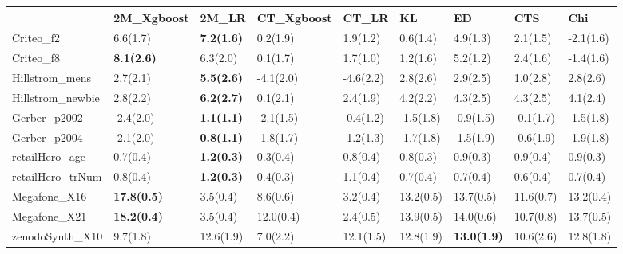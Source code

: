 
\begin{tabular}{|l|llllllll|}
\hline
{} &          2M\_Xgboost &                2M\_LR & CT\_Xgboost & CT\_LR &                  KL &                   ED &        CTS &                 Chi \\
\hline
Criteo\_f2        &             6.6(1.7) &  \bfseries 7.2(1.6) &    0.2(1.9) &            1.9(1.2) &            0.6(1.4) &             4.9(1.3) &   2.1(1.5) &           -2.1(1.6) \\
Criteo\_f8        &   \bfseries 8.1(2.6) &            6.3(2.0) &    0.1(1.7) &            1.7(1.0) &            1.2(1.6) &             5.2(1.2) &   2.4(1.6) &           -1.4(1.6) \\
Hillstrom\_mens   &             2.7(2.1) &  \bfseries 5.5(2.6) &   -4.1(2.0) &           -4.6(2.2) &            2.8(2.6) &             2.9(2.5) &   1.0(2.8) &            2.8(2.6) \\
Hillstrom\_newbie &             2.8(2.2) &  \bfseries 6.2(2.7) &    0.1(2.1) &            2.4(1.9) &            4.2(2.2) &             4.3(2.5) &   4.3(2.5) &            4.1(2.4) \\
Gerber\_p2002     &            -2.4(2.0) &  \bfseries 1.1(1.1) &   -2.1(1.5) &           -0.4(1.2) &           -1.5(1.8) &            -0.9(1.5) &  -0.1(1.7) &           -1.5(1.8) \\
Gerber\_p2004     &            -2.1(2.0) &  \bfseries 0.8(1.1) &   -1.8(1.7) &           -1.2(1.3) &           -1.7(1.8) &            -1.5(1.9) &  -0.6(1.9) &           -1.9(1.8) \\
retailHero\_age   &             0.7(0.4) &  \bfseries 1.2(0.3) &    0.3(0.4) &            0.8(0.4) &            0.8(0.3) &             0.9(0.3) &   0.9(0.4) &            0.9(0.3) \\
retailHero\_trNum &             0.8(0.4) &  \bfseries 1.2(0.3) &    0.4(0.3) &            1.1(0.4) &            0.7(0.4) &             0.7(0.4) &   0.6(0.4) &            0.7(0.4) \\
Megafone\_X16     &  \bfseries 17.8(0.5) &            3.5(0.4) &    8.6(0.6) &            3.2(0.4) &           13.2(0.5) &            13.7(0.5) &  11.6(0.7) &           13.2(0.4) \\
Megafone\_X21     &  \bfseries 18.2(0.4) &            3.5(0.4) &   12.0(0.4) &            2.4(0.5) &           13.9(0.5) &            14.0(0.6) &  10.7(0.8) &           13.7(0.5) \\
zenodoSynth\_X10  &             9.7(1.8) &           12.6(1.9) &    7.0(2.2) &           12.1(1.5) &           12.8(1.9) &  \bfseries 13.0(1.9) &  10.6(2.6) &           12.8(1.8) \\

\end{tabular}
